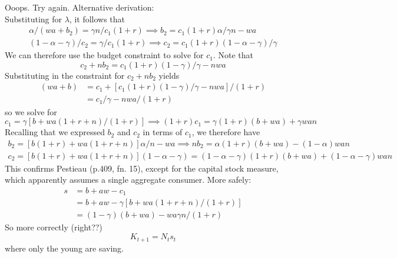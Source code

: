 \documentclass{article}
\begin{document}
Ooops.  Try again.
Alternative derivation:\\
Substituting for $\lambda$, it follows that
\begin{gather}
\alpha/(wa+b_{2}) = \gamma n/ c_{1} (1+r) \implies b_{2} = c_{1} (1+r) \alpha /\gamma n - wa
\\
(1-\alpha-\gamma)/ c_{2} = \gamma / c_{1} (1+r)  \implies  c_{2} = c_{1}(1+r) (1-\alpha-\gamma)/\gamma 
\end{gather}
We can therefore use the budget constraint to solve for $c_{1}$.
Note that
\begin{equation}
c_{2} + n b_{2} = c_{1}(1+r)(1-\gamma)/\gamma - nwa
\end{equation}
Substituting in the constraint for $c_{2} + n b_{2}$ yields
\begin{equation}
\begin{split}
(w a + b)
&= c_{1} + [c_{1}(1+r)(1-\gamma)/\gamma - nwa]/(1+r)
\\
&= c_{1}/\gamma - nwa/(1+r)
\end{split}
\end{equation}
so we solve for
\begin{equation}
c_{1} = \gamma[b + wa(1+r+n)/(1+r)] \implies 
(1+r)c_{1} = \gamma(1+r)(b + wa) + \gamma wan
\end{equation}
Recalling that we expressed $b_{2}$ and $c_{2}$ in terms of $c_{1}$, we therefore have
\begin{gather}
b_{2} =  [b(1+r) + wa(1+r+n)] \alpha /n - wa \implies nb_{2} = \alpha(1+r)(b+wa) - (1-\alpha)wan
\\
c_{2} = [b(1+r) + wa(1+r+n)] (1-\alpha-\gamma) = (1-\alpha-\gamma)(1+r)(b+wa) + (1-\alpha-\gamma)wan
\end{gather}
This confirms Pestieau (p.409, fn. 15), except for the capital stock measure,
which apparently assumes a single aggregate consumer.  More safely:
\begin{equation}
\begin{split}
s
&= b + aw - c_{1}
\\
&= b + aw - \gamma[b + wa(1+r+n)/(1+r)]
\\
&= (1-\gamma)(b+wa) - wa \gamma n/(1+r)
\end{split}
\end{equation}
So more correctly (right??)  %
\begin{equation}
K_{t+1} = N_{t} s_{t}
\end{equation}
where only the young are saving.

\end{document}
